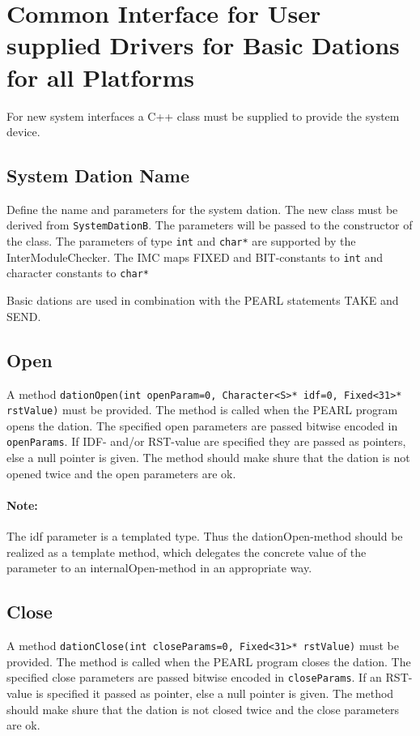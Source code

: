 \section{Common Interface for User supplied Drivers for Basic Dations
for all Platforms}
For new  system interfaces a C++ class must be supplied to 
provide the system device.

\subsection{System Dation Name}
Define the name and parameters for the system dation.
The new class must be derived from \verb|SystemDationB|.
The parameters will be passed to the constructor of the class.
The parameters of type \verb|int| and \verb|char*| are supported
by the InterModuleChecker. The IMC maps FIXED and BIT-constants 
to \verb|int| and character constants to \verb|char*|

Basic dations are used in combination with the PEARL statements TAKE and
SEND.

\subsection{Open}
A method \verb|dationOpen(int openParam=0, Character<S>* idf=0, Fixed<31>* rstValue)|
must be provided.
The method is called when the PEARL program opens the dation.
The specified open parameters are passed bitwise encoded in \verb|openParams|.
If IDF- and/or RST-value are specified they are passed as pointers, else
a null pointer is given.
The method should make shure that the dation is not opened twice and
the open parameters are ok.

\paragraph{Note:} The idf parameter is a templated type.
 Thus the dationOpen-method should be realized as a template method,
 which delegates the concrete value of the parameter to an
 internalOpen-method in an appropriate way.

\subsection{Close}
A method \verb|dationClose(int closeParams=0, Fixed<31>* rstValue)|
must be provided.
The method is called when the PEARL program closes the dation.
The specified close parameters are passed bitwise encoded in \verb|closeParams|.
If an RST-value is specified it passed as pointer, else
a null pointer is given.
The method should make shure that the dation is not closed twice and
the close parameters are ok.

